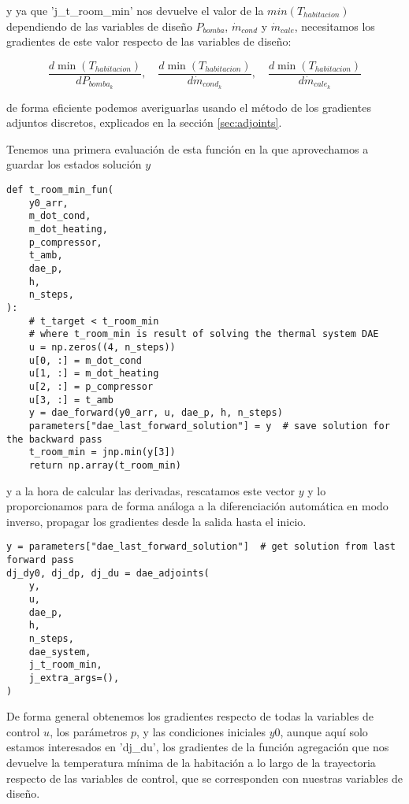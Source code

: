 y ya que 'j\_t\_room\_min' nos devuelve el valor de la $min(T_{habitacion})$
dependiendo de las variables de diseño $P_{bomba}$, $\dot{m}_{cond}$ y
$\dot{m}_{cale}$, necesitamos los gradientes de este valor respecto de las
variables de diseño:

\begin{equation*}
	\frac{d \min(T_{habitacion})}{d P_{bomba_k}}, \quad \frac{d \min(T_{habitacion})}{d \dot{m}_{cond_k}}, \quad \frac{d \min(T_{habitacion})}{d \dot{m}_{cale_k}}
\end{equation*}

de forma eficiente podemos averiguarlas usando el método de los gradientes
adjuntos discretos, explicados en la sección \ref{sec:adjoints}.

Tenemos una primera evaluación de esta función en la que aprovechamos a guardar
los estados solución $y$

\begin{verbatim}
def t_room_min_fun(
    y0_arr,
    m_dot_cond,
    m_dot_heating,
    p_compressor,
    t_amb,
    dae_p,
    h,
    n_steps,
):
    # t_target < t_room_min
    # where t_room_min is result of solving the thermal system DAE
    u = np.zeros((4, n_steps))
    u[0, :] = m_dot_cond
    u[1, :] = m_dot_heating
    u[2, :] = p_compressor
    u[3, :] = t_amb
    y = dae_forward(y0_arr, u, dae_p, h, n_steps)
    parameters["dae_last_forward_solution"] = y  # save solution for the backward pass
    t_room_min = jnp.min(y[3])
    return np.array(t_room_min)
\end{verbatim}

y a la hora de calcular las derivadas, rescatamos este vector $y$ y lo
proporcionamos para de forma análoga a la diferenciación automática en modo
inverso, propagar los gradientes desde la salida hasta el inicio.

\begin{verbatim}
y = parameters["dae_last_forward_solution"]  # get solution from last forward pass
dj_dy0, dj_dp, dj_du = dae_adjoints(
    y,
    u,
    dae_p,
    h,
    n_steps,
    dae_system,
    j_t_room_min,
    j_extra_args=(),
)
\end{verbatim}

De forma general obtenemos los gradientes respecto de todas la variables de
control $u$, los parámetros $p$, y las condiciones iniciales $y0$, aunque aquí
solo estamos interesados en 'dj\_du', los gradientes de la función agregación
que nos devuelve la temperatura mínima de la habitación a lo largo de la
trayectoria respecto de las variables de control, que se corresponden con
nuestras variables de diseño.


